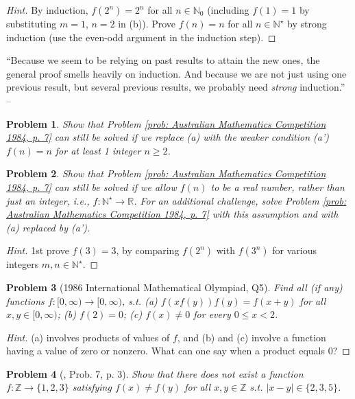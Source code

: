\documentclass[oneside]{book}
\numberwithin{equation}{section}
\newtheorem{problem}{Problem}[section]
\begin{document}
\begin{proof}[Hint]
	By induction, $f(2^n) = 2^n$ for all $n\in\mathbb{N}_0$ (including $f(1) = 1$ by substituting $m = 1$, $n = 2$ in (b)). Prove $f(n) = n$ for all $n\in\mathbb{N}^\star$ by strong induction (use the even-odd argument in the induction step). 
\end{proof}
``Because we seem to be relying on past results to attain the new ones, the general proof smells heavily on induction. And because we are not just using one previous result, but several previous results, we probably need \textit{strong} induction.'' -- \cite[p. 40]{Tao2006}

\begin{problem}
	Show that Problem \ref{prob: Australian Mathematics Competition 1984, p. 7} can still be solved if we replace (a) with the weaker condition (a') $f(n) = n$ for at least 1 integer $n\ge 2$.
\end{problem}

\begin{problem}
	Show that Problem \ref{prob: Australian Mathematics Competition 1984, p. 7} can still be solved if we allow $f(n)$ to be a real number, rather than just an integer, i.e., $f:\mathbb{N}^\star\to\mathbb{R}$. For an additional challenge, solve Problem \ref{prob: Australian Mathematics Competition 1984, p. 7} with this assumption and with (a) replaced by (a').
\end{problem}

\begin{proof}[Hint]
	1st prove $f(3) = 3$, by comparing $f(2^n)$ with $f(3^n)$ for various integers $m,n\in\mathbb{N}^\star$.
\end{proof}

\begin{problem}[1986 International Mathematical Olympiad, Q5]
	Find all (if any) functions $f:[0,\infty)\to[0,\infty)$, s.t. (a) $f(xf(y))f(y) = f(x + y)$ for all $x,y\in[0,\infty)$; (b) $f(2) = 0$; (c) $f(x)\ne 0$ for every $0\le x < 2$.
\end{problem}

\begin{proof}[Hint]
	(a) involves products of values of $f$, and (b) and (c) involve a function having a value of zero or nonzero. What can one say when a product equals 0?
\end{proof}

\begin{problem}[\cite{Gelca_Andreescu2017}, Prob. 7, p. 3]
	Show that there does not exist a function $f:\mathbb{Z}\to\{1,2,3\}$ satisfying $f(x)\ne f(y)$ for all $x,y\in\mathbb{Z}$ s.t. $|x - y|\in\{2,3,5\}$.
\end{problem}
\end{document}
